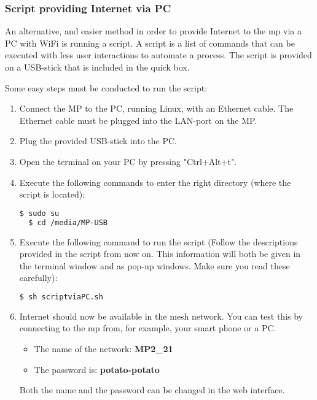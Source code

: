 \subsubsection{Script providing Internet via PC}

An alternative, and easier method in order to provide Internet to the \gls{mp} via a PC with WiFi is running a script. A script is a list of commands that can be executed with less user interactions to automate a process. The script is provided on a USB-stick that is included in the \gls{quick} box. 

Some easy steps must be conducted to run the script:
\begin{enumerate}
\item Connect the MP to the PC, running Linux, with an Ethernet cable. The Ethernet cable must be plugged into the LAN-port on the MP.
\item Plug the provided USB-stick into the PC.  
\item Open the terminal on your PC by pressing "Ctrl+Alt+t". 
\item Execute the following commands to enter the right directory (where the script is located):
\noindent
\begin{lstlisting}[language=bash]
  $ sudo su
  $ cd /media/MP-USB
\end{lstlisting}
\item Execute the following command to run the script (Follow the descriptions provided in the script from now on. This information will both be given in the terminal window and as pop-up windows. Make sure you read these carefully):
\noindent
\begin{lstlisting}[language=bash]
  $ sh scriptviaPC.sh
\end{lstlisting}
\item Internet should now be available in the mesh network. You can test this by connecting to the \gls{mp} from, for example, your smart phone or a PC. 
\begin{itemize}
\item The name of the network: \textbf{MP2_21}
\item The password is: \textbf{potato-potato}
\end{itemize}
Both the name and the password can be changed in the web interface. 
\end{enumerate}